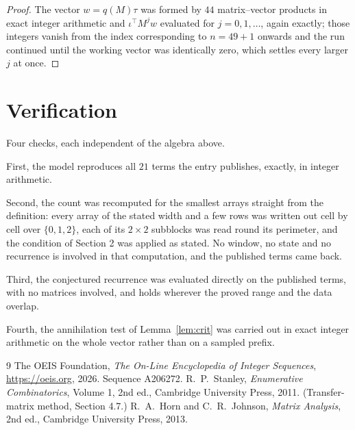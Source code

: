 \documentclass[11pt,a4paper]{article}
\theoremstyle{plain}
\theoremstyle{definition}
\begin{document}
\begin{proof}
The vector $w=q(M)\tau$ was formed by $44$ matrix--vector products in exact integer
arithmetic and $\iota^{\!\top}M^{j}w$ evaluated for $j=0,1,\dots$, again exactly; those
integers vanish from the index corresponding to $n=49+1$ onwards and the run continued
until the working vector was identically zero, which settles every larger $j$ at once.
\end{proof}

\section{Verification}

Four checks, each independent of the algebra above.

First, the model reproduces all $21$ terms the entry publishes, exactly, in integer
arithmetic.

Second, the count was recomputed for the smallest arrays straight from the definition: every
array of the stated width and a few rows was written out cell by cell over $\{0,1,2\}$, each of
its $2\times2$ subblocks was read round its perimeter, and the condition of Section 2 was
applied as stated. No window, no state and no recurrence is involved in that computation, and
the published terms came back.

Third, the conjectured recurrence was evaluated directly on the published terms, with no
matrices involved, and holds wherever the proved range and the data overlap.

Fourth, the annihilation test of Lemma~\ref{lem:crit} was carried out in exact integer
arithmetic on the whole vector rather than on a sampled prefix.

\begin{thebibliography}{9}
 The OEIS Foundation, \emph{The On-Line Encyclopedia of Integer
Sequences}, \url{https://oeis.org}, 2026. Sequence A206272.
 R.~P.~Stanley, \emph{Enumerative Combinatorics}, Volume 1, 2nd ed.,
Cambridge University Press, 2011. (Transfer-matrix method, Section 4.7.)
 R.~A.~Horn and C.~R.~Johnson, \emph{Matrix Analysis}, 2nd ed., Cambridge
University Press, 2013.
\end{thebibliography}
\end{document}
